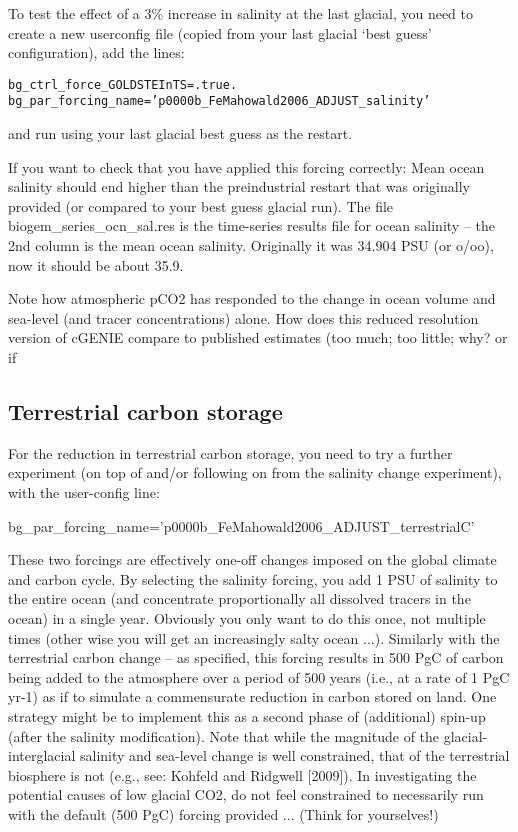 \documentclass[11pt,fleqn]{book} %
\begin{document}
To test the effect of a 3\% increase in salinity at the last glacial, you need to create a new userconfig
file (copied from your last glacial ‘best guess’ configuration), add the lines:
\vspace{-2mm}\begin{verbatim}
bg_ctrl_force_GOLDSTEInTS=.true.
bg_par_forcing_name=’p0000b_FeMahowald2006_ADJUST_salinity’
\end{verbatim}\vspace{-2mm}
and run using your last glacial best guess as the restart.

If you want to check that you have applied this forcing correctly: Mean ocean salinity should end higher than the preindustrial restart that was
originally provided (or compared to your best guess glacial run). The file
biogem\_series\_ocn\_sal.res is the time-series results file for ocean salinity – the 2nd
column is the mean ocean salinity. Originally it was 34.904 PSU (or o/oo), now it should be
about 35.9.

Note how atmospheric pCO2 has responded to the change in ocean volume and sea-level
(and tracer concentrations) alone. How does this reduced resolution version of cGENIE
compare to published estimates (too much; too little; why? or if

%
\subsection{Terrestrial carbon storage}

For the reduction in terrestrial carbon storage, you need to try a further experiment (on top of
and/or following on from the salinity change experiment), with the user-config line:

bg\_par\_forcing\_name=’p0000b\_FeMahowald2006\_ADJUST\_terrestrialC’

These two forcings are effectively one-off changes imposed on the global climate and carbon
cycle. By selecting the salinity forcing, you add 1 PSU of salinity to the entire ocean (and
concentrate proportionally all dissolved tracers in the ocean) in a single year. Obviously you only
want to do this once, not multiple times (other wise you will get an increasingly salty ocean ...).
Similarly with the terrestrial carbon change – as specified, this forcing results in 500 PgC of carbon
being added to the atmosphere over a period of 500 years (i.e., at a rate of 1 PgC yr-1) as if to
simulate a commensurate reduction in carbon stored on land. One strategy might be to implement
this as a second phase of (additional) spin-up (after the salinity modification). Note that while the
magnitude of the glacial-interglacial salinity and sea-level change is well constrained, that of the
terrestrial biosphere is not (e.g., see: Kohfeld and Ridgwell [2009]). In investigating the potential
causes of low glacial CO2, do not feel constrained to necessarily run with the default (500 PgC)
forcing provided ... (Think for yourselves!)
\end{document}
